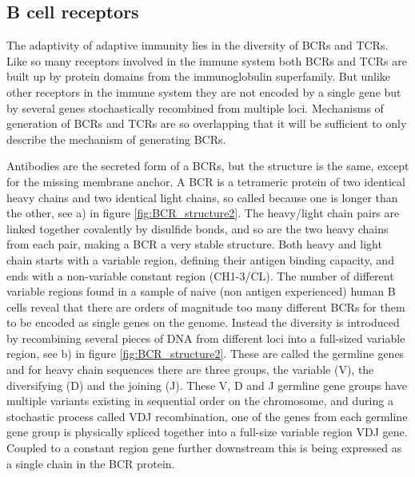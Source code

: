 \subsection{B cell receptors}
The adaptivity of adaptive immunity lies in the diversity of BCRs and TCRs.
Like so many receptors involved in the immune system both BCRs and TCRs are built up by protein domains from the immunoglobulin superfamily.
But unlike other receptors in the immune system they are not encoded by a single gene but by several genes stochastically recombined from multiple loci.
Mechanisms of generation of BCRs and TCRs are so overlapping that it will be sufficient to only describe the mechanism of generating BCRs.

Antibodies are the secreted form of a BCRs, but the structure is the same, except for the missing membrane anchor.
A BCR is a tetrameric protein of two identical heavy chains and two identical light chains, so called because one is longer than the other, see a) in figure \ref{fig:BCR_structure2}.
The heavy/light chain pairs are linked together covalently by disulfide bonds, and so are the two heavy chains from each pair, making a BCR a very stable structure.
Both heavy and light chain starts with a variable region, defining their antigen binding capacity, and ends with a non-variable constant region (CH1-3/CL).
The number of different variable regions found in a sample of naive (non antigen experienced) human B cells reveal that there are orders of magnitude too many different BCRs for them to be encoded as single genes on the genome.
Instead the diversity is introduced by recombining several pieces of DNA from different loci into a full-sized variable region, see b) in figure \ref{fig:BCR_structure2}.
These are called the germline genes and for heavy chain sequences there are three groups, the variable (V), the diversifying (D) and the joining (J).
These V, D and J germline gene groups have multiple variants existing in sequential order on the chromosome, and during a stochastic process called VDJ recombination, one of the genes from each germline gene group is physically spliced together into a full-size variable region VDJ gene.
Coupled to a constant region gene further downstream this is being expressed as a single chain in the BCR protein.

